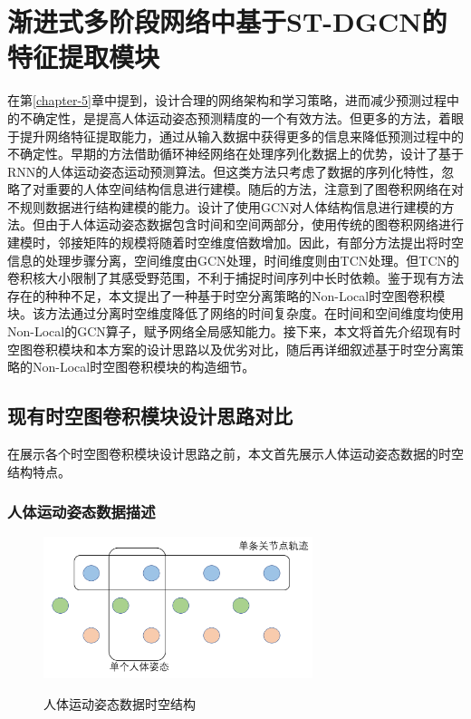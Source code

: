 \chapter{渐进式多阶段网络中基于ST-DGCN的特征提取模块}\label{section:ST-DGCN}
在第\ref{chapter-5}章中提到，设计合理的网络架构和学习策略，进而减少预测过程中的不确定性，是提高人体运动姿态预测精度的一个有效方法。但更多的方法，着眼于提升网络特征提取能力，通过从输入数据中获得更多的信息来降低预测过程中的不确定性。早期的方法借助循环神经网络在处理序列化数据上的优势，设计了基于RNN的人体运动姿态运动预测算法。但这类方法只考虑了数据的序列化特性，忽略了对重要的人体空间结构信息进行建模。随后的方法，注意到了图卷积网络在对不规则数据进行结构建模的能力。设计了使用GCN对人体结构信息进行建模的方法。但由于人体运动姿态数据包含时间和空间两部分，使用传统的图卷积网络进行建模时，邻接矩阵的规模将随着时空维度倍数增加。因此，有部分方法提出将时空信息的处理步骤分离，空间维度由GCN处理，时间维度则由TCN\parencite{oord2016wavenet}处理。但TCN的卷积核大小限制了其感受野范围，不利于捕捉时间序列中长时依赖。鉴于现有方法存在的种种不足，本文提出了一种基于时空分离策略的Non-Local时空图卷积模块。该方法通过分离时空维度降低了网络的时间复杂度。在时间和空间维度均使用Non-Local的GCN算子，赋予网络全局感知能力。接下来，本文将首先介绍现有时空图卷积模块和本方案的设计思路以及优劣对比，随后再详细叙述基于时空分离策略的Non-Local时空图卷积模块的构造细节。

\section{现有时空图卷积模块设计思路对比}
在展示各个时空图卷积模块设计思路之前，本文首先展示人体运动姿态数据的时空结构特点。

\subsection{人体运动姿态数据描述}
\begin{figure}[ht]
    \centering
    \includegraphics[width=0.70\textwidth]{FigMa/human_pose_seq.png}\\
    \vspace{-0.3cm}
    \caption{人体运动姿态数据时空结构}
    \label{fig:human_pose_seq_structure}
\end{figure}

